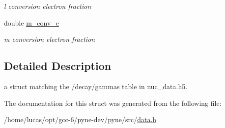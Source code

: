 \begin{DoxyCompactItemize}
\begin{DoxyCompactList}\small\item\em l conversion electron fraction \end{DoxyCompactList}\item 
double \hyperlink{structpyne_1_1gamma_a6c664717050818947e2e79d75e914c41}{m\+\_\+conv\+\_\+e}\hypertarget{structpyne_1_1gamma_a6c664717050818947e2e79d75e914c41}{}\label{structpyne_1_1gamma_a6c664717050818947e2e79d75e914c41}

\begin{DoxyCompactList}\small\item\em m conversion electron fraction \end{DoxyCompactList}\end{DoxyCompactItemize}


\subsection{Detailed Description}
a struct matching the \textquotesingle{}/decay/gammas\textquotesingle{} table in nuc\+\_\+data.\+h5. 

The documentation for this struct was generated from the following file\+:\begin{DoxyCompactItemize}
\item 
/home/lucas/opt/gcc-\/6/pyne-\/dev/pyne/src/\hyperlink{data_8h}{data.\+h}\end{DoxyCompactItemize}
